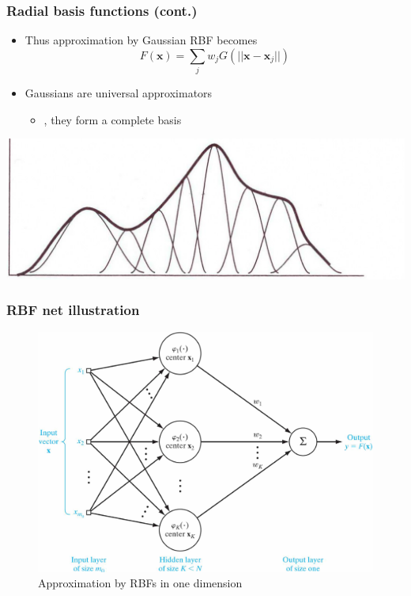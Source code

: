 \documentclass[12pt,notes,mathserif]{beamer}
\begin{document}
\begin{frame}[c]
	\frametitle{Radial basis functions (cont.)}
	\begin{itemize}
		\item Thus approximation by Gaussian RBF becomes
		      \[
			      F(\mathbf{x})=\sum_jw_jG(||\mathbf{x}-\mathbf{x}_j||)
		      \]
		\item Gaussians are universal approximators
		      \begin{itemize}
			      \item \ie, they form a complete basis
		      \end{itemize}
	\end{itemize}
	\begin{center}
		\includegraphics[width=0.99\linewidth]{fig/lec711.jpg}
	\end{center}
\end{frame}

\begin{frame}[c]
	\frametitle{RBF net illustration}
	\begin{figure}
		\centering
		\includegraphics[width=0.99\linewidth]{fig/lec712.jpg}
		\caption{Approximation by RBFs in one dimension}
	\end{figure}
\end{frame}
\end{document}
